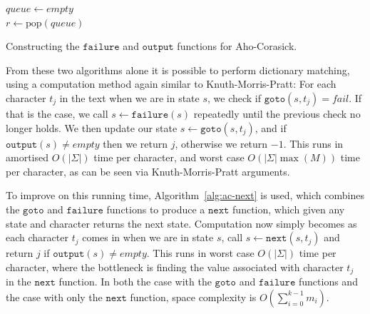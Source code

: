 \documentclass[ %
                    author={Dominic Joseph Moylett},
                    degree={MEng},
                     title={Dictionary Matching with Fingerprints},
                  subtitle={An Empirical Analysis},
                      type={Research},
                      year={2014} ]{dissertation}
\begin{document}
\begin{algorithm}[t]
$queue \gets empty$\\
 {
  $r \gets \text{pop}(queue)$\\
}
\caption{Constructing the $\texttt{failure}$ and $\texttt{output}$ functions for Aho-Corasick.}
\label{alg:ac-failure}
\end{algorithm}

From these two algorithms alone it is possible to perform dictionary matching, using a computation method again similar to Knuth-Morris-Pratt: For each character $t_j$ in the text when we are in state $s$, we check if $\texttt{goto}(s, t_j) = fail$. If that is the case, we call $s \gets \texttt{failure}(s)$ repeatedly until the previous check no longer holds. We then update our state $s \gets \texttt{goto}(s, t_j)$, and if $\texttt{output}(s) \neq empty$ then we return $j$, otherwise we return $-1$. This runs in amortised $O(|\Sigma|)$ time per character, and worst case $O(|\Sigma|\max(M))$ time per character, as can be seen via Knuth-Morris-Pratt arguments.

To improve on this running time, Algorithm~\ref{alg:ac-next} is used, which combines the $\texttt{goto}$ and $\texttt{failure}$ functions to produce a $\texttt{next}$ function, which given any state and character returns the next state. Computation now simply becomes as each character $t_j$ comes in when we are in state $s$, call $s \gets \texttt{next}(s, t_j)$ and return $j$ if $\texttt{output}(s) \neq empty$. This runs in worst case $O(|\Sigma|)$ time per character, where the bottleneck is finding the value associated with character $t_j$ in the $\texttt{next}$ function. In both the case with the $\texttt{goto}$ and $\texttt{failure}$ functions and the case with only the $\texttt{next}$ function, space complexity is $O(\sum_{i=0}^{k-1}m_i)$.
\end{document}
